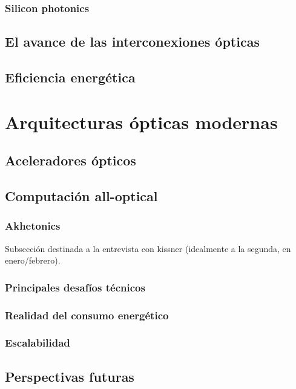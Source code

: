 \documentclass[12pt,a4paper]{report}
\begin{document}
\subsection{Silicon photonics}

\section{El avance de las interconexiones ópticas}

\section{Eficiencia energética}



\chapter{Arquitecturas ópticas modernas}

\section{Aceleradores ópticos}

\section{Computación all-optical}

\subsection{Akhetonics}

Subsección destinada a la entrevista con kissner (idealmente a la segunda, en enero/febrero).

\subsection{Principales desafíos técnicos}

\subsection{Realidad del consumo energético}

\subsection{Escalabilidad}

\section{Perspectivas futuras}
\end{document}
